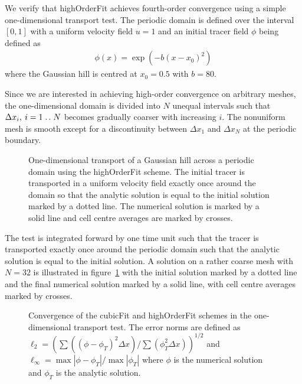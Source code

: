 \documentclass[a4paper,11pt]{article}
\newcommand{\isep}{\mathrel{{.}\,{.}}\nobreak}
\begin{document}
We verify that highOrderFit achieves fourth-order convergence using a simple one-dimensional transport test.  The periodic domain is defined over the interval $[0,1]$ with a uniform velocity field $u = 1$ and an initial tracer field $\phi$ being defined as
\begin{align}
	\phi(x) = \exp \left( -b \left( x - x_0 \right)^2 \right)
\end{align}
where the Gaussian hill is centred at $x_0 = 0.5$ with $b = 80$.

Since we are interested in achieving high-order convergence on arbitrary meshes, the one-dimensional domain is divided into $N$ unequal intervals such that $\Delta x_i, \: i = 1\isep N$ becomes gradually coarser with increasing $i$.  The nonuniform mesh is smooth except for a discontinuity between $\Delta x_1$ and $\Delta x_N$ at the periodic boundary.

\begin{figure}
	\centering
	
	\caption{One-dimensional transport of a Gaussian hill across a periodic domain using the highOrderFit scheme.  The initial tracer is transported in a uniform velocity field exactly once around the domain so that the analytic solution is equal to the initial solution marked by a dotted line.  The numerical solution is marked by a solid line and cell centre averages are marked by crosses.}
	\label{fig:advect1D-tracer}
\end{figure}

The test is integrated forward by one time unit such that the tracer is transported exactly once around the periodic domain such that the analytic solution is equal to the initial solution.  A solution on a rather coarse mesh with $N = 32$ is illustrated in figure~\ref{fig:advect1D-tracer} with the initial solution marked by a dotted line and the final numerical solution marked by a solid line, with cell centre averages marked by crosses.

\begin{figure}
	\centering
	
	\caption{Convergence of the cubicFit and highOrderFit schemes in the one-dimensional transport test.
	The error norms are defined as $\ell_2 = \left( \sum \left( \left( \phi - \phi_T \right)^2 \Delta x \right) / \sum \left( \phi_T^2 \Delta x \right)\right)^{1/2}$ and $\ell_\infty = \max \left| \phi - \phi_T \right| / \max \left| \phi_T \right|$ where $\phi$ is the numerical solution and $\phi_T$ is the analytic solution.}
	\label{fig:advect1D-convergence}
\end{figure}
\end{document}

